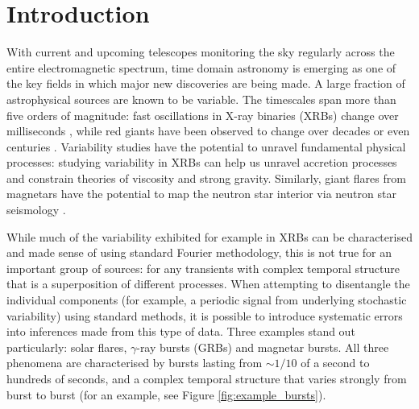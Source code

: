 \documentclass[12pt]{emulateapj}
\begin{document}

\section{Introduction}

With current and upcoming telescopes monitoring the sky regularly across the entire electromagnetic spectrum, time domain astronomy is emerging as one of the key fields in which major 
new discoveries are being made.  A large fraction of astrophysical sources are known to be variable. The timescales span more than five orders of magnitude: fast oscillations in 
X-ray binaries (XRBs) change over milliseconds \citep[e.g.\ ][]{xrb_khzqpos}, while red giants have been observed to change over decades or even centuries \citep[e.g.\ ][]{dasch_giants}. 
Variability studies have the potential to unravel fundamental physical processes: studying variability in XRBs can help us unravel accretion processes and constrain theories of viscosity and strong gravity. 
Similarly, giant flares from magnetars have the potential to map the neutron star interior via neutron star seismology \citep{steiner2009}. 

While much of the variability exhibited for example in XRBs can be characterised and made sense of using standard Fourier methodology, this is not true for an important group of sources: for any transients 
with complex temporal structure that is a superposition of different processes. When attempting to disentangle the individual components (for example, a periodic signal from underlying stochastic variability)
using standard methods, it is possible to introduce systematic errors into inferences made from this type of data. Three examples stand out particularly: solar flares, $\gamma$-ray bursts (GRBs) and magnetar bursts.  All three phenomena are characterised by bursts lasting from $\sim\!\! 1/10$ of a second to hundreds of seconds, and a 
complex temporal structure that varies strongly from burst to burst (for an example, see Figure \ref{fig:example_bursts}). 
\end{document}
